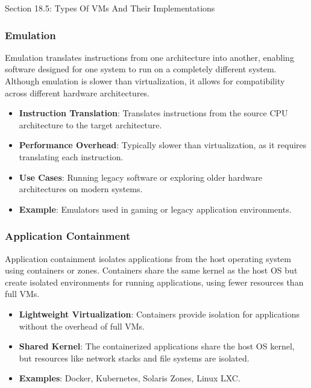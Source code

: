 \begin{notes}{Section 18.5: Types Of VMs And Their Implementations}
\begin{highlight}[Paravirtualization]
    \end{highlight}
    
    \subsubsection*{Emulation}
    
    Emulation translates instructions from one architecture into another, enabling software designed for one system to run on a completely different system. Although emulation is slower than virtualization, 
    it allows for compatibility across different hardware architectures.
    
    \begin{highlight}[Emulation]
    
        \begin{itemize}
            \item \textbf{Instruction Translation}: Translates instructions from the source CPU architecture to the target architecture.
            \item \textbf{Performance Overhead}: Typically slower than virtualization, as it requires translating each instruction.
            \item \textbf{Use Cases}: Running legacy software or exploring older hardware architectures on modern systems.
            \item \textbf{Example}: Emulators used in gaming or legacy application environments.
        \end{itemize}
    
    \end{highlight}
    
    \subsubsection*{Application Containment}
    
    Application containment isolates applications from the host operating system using containers or zones. Containers share the same kernel as the host OS but create isolated environments for running 
    applications, using fewer resources than full VMs.
    
    \begin{highlight}
    
        \begin{itemize}
            \item \textbf{Lightweight Virtualization}: Containers provide isolation for applications without the overhead of full VMs.
            \item \textbf{Shared Kernel}: The containerized applications share the host OS kernel, but resources like network stacks and file systems are isolated.
            \item \textbf{Examples}: Docker, Kubernetes, Solaris Zones, Linux LXC.
        \end{itemize}
    

\end{highlight}
\end{notes}
